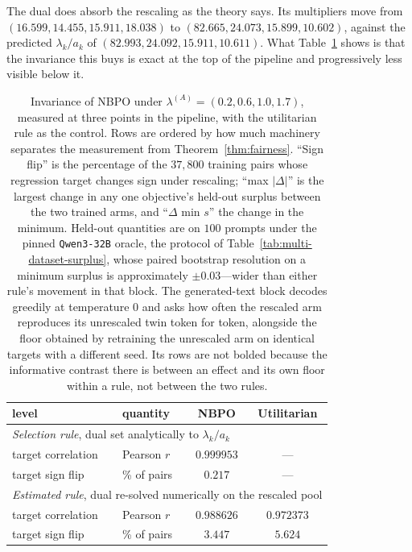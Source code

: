 \documentclass{article}
\theoremstyle{remark}
\theoremstyle{plain}
\newcommand{\NBPO}{\textsc{NBPO}}
\begin{document}
The dual does absorb the rescaling as the theory says. Its multipliers move from
$(16.599,14.455,15.911,18.038)$ to $(82.665,24.073,15.899,10.602)$, against the predicted $\lambda_k/a_k$ of
$(82.993,24.092,15.911,10.611)$. What Table~\ref{tab:scale-pipeline} shows is that the invariance this
buys is exact at the top of the pipeline and progressively less visible below it.

\begin{table}[htbp]
\centering\footnotesize
\setlength{\tabcolsep}{4.0pt}
\caption{Invariance of \NBPO{} under $\lambda^{(A)}=(0.2,0.6,1.0,1.7)$, measured at three points in the
pipeline, with the utilitarian rule as the control. Rows are ordered by how much machinery separates the
measurement from Theorem~\ref{thm:fairness}. ``Sign flip'' is the percentage of the $37{,}800$ training
pairs whose regression target changes sign under rescaling; ``max $|\Delta|$'' is the largest change in any
one objective's held-out surplus between the two trained arms, and ``$\Delta$ min $s$'' the change in the
minimum. Held-out quantities are on $100$ prompts under the pinned \texttt{Qwen3-32B} oracle, the protocol
of Table~\ref{tab:multi-dataset-surplus}, whose paired bootstrap resolution on a minimum surplus is
approximately $\pm0.03$---wider than either rule's movement in that block. The generated-text block
decodes greedily at temperature $0$ and asks how often the rescaled arm reproduces its unrescaled twin
token for token, alongside the floor obtained by retraining the unrescaled arm on identical targets with
a different seed. Its rows are not bolded because the informative contrast there is between an effect and
its own floor within a rule, not between the two rules.}
\label{tab:scale-pipeline}
\begin{tabular}{llcc}
\toprule
level & quantity & \NBPO{} & Utilitarian\\
\midrule
\multicolumn{4}{l}{\emph{Selection rule}, dual set analytically to $\lambda_k/a_k$}\\
\quad target correlation & Pearson $r$ & $0.999953$ & ---\\
\quad target sign flip & \% of pairs & $\mathbf{0.217}$ & ---\\
\midrule
\multicolumn{4}{l}{\emph{Estimated rule}, dual re-solved numerically on the rescaled pool}\\
\quad target correlation & Pearson $r$ & $\mathbf{0.988626}$ & $0.972373$\\
\quad target sign flip & \% of pairs & $\mathbf{3.447}$ & $5.624$\\

\end{tabular}
\end{table}
\end{document}
